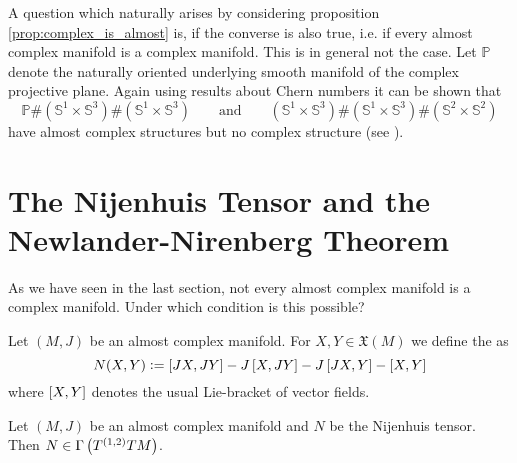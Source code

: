 A question which naturally arises by considering proposition \ref{prop:complex_is_almost} is, if the converse is also true, i.e. if every almost complex manifold is a complex manifold. This is in general not the case. Let $\mathbb{P}$ denote the naturally oriented underlying smooth manifold of the complex projective plane. Again using results about Chern numbers it can be shown that
\begin{equation}
\mathbb{P} \# (\mathbb{S}^1 \times \mathbb{S}^3) \# (\mathbb{S}^1 \times \mathbb{S}^3) \qquad \text{and} \qquad (\mathbb{S}^1 \times \mathbb{S}^3) \# (\mathbb{S}^1 \times \mathbb{S}^3) \# (\mathbb{S}^2 \times \mathbb{S}^2)
\end{equation}
\noindent have almost complex structures but no complex structure (see \cite[1627]{ven:chern:1966}). 

\section{The Nijenhuis Tensor and the Newlander-Nirenberg Theorem}
As we have seen in the last section, not every almost complex manifold is a complex manifold. Under which condition is this possible?

\begin{definition}
Let $(M,J)$ be an almost complex manifold. For $X,Y \in \mathfrak{X}(M)$ we define the  as
\begin{equation}
N(X,Y) := \sbr[0]{JX,JY} - J\sbr[0]{X,JY} - J\sbr[0]{JX,Y} - \sbr[0]{X,Y}
\end{equation}
\noindent where $\sbr[0]{X,Y}$ denotes the usual Lie-bracket of vector fields.
\end{definition}

\begin{proposition}
Let $(M,J)$ be an almost complex manifold and $N$ be the Nijenhuis tensor. Then $N \in \Gamma\del[1]{T^{(1,2)}TM}$.
\label{prop:nijenhuis_tensor}
\end{proposition}

